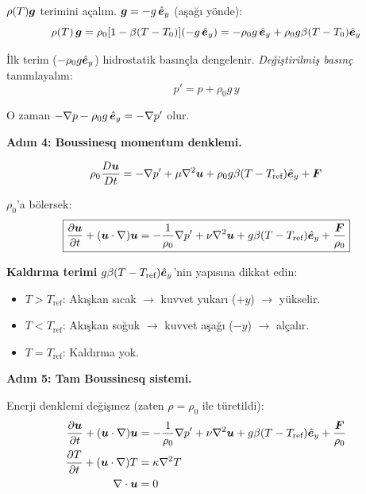$\rho(T)\bm{g}$ terimini açalım. $\bm{g} = -g\,\hat{\bm{e}}_y$ (aşağı yönde):
\begin{equation}
    \rho(T)\,\bm{g} = \rho_0[1 - \beta(T-T_0)](-g\,\hat{\bm{e}}_y) = -\rho_0 g\,\hat{\bm{e}}_y + \rho_0 g\beta(T-T_0)\hat{\bm{e}}_y
\end{equation}

İlk terim ($-\rho_0 g\hat{\bm{e}}_y$) hidrostatik basınçla dengelenir. \textit{Değiştirilmiş basınç} tanımlayalım:
\begin{equation}
    p' = p + \rho_0 g\,y
    \label{eq:modified_pressure}
\end{equation}

O zaman $-\nabla p - \rho_0 g\,\hat{\bm{e}}_y = -\nabla p'$ olur.

\textbf{Adım 4: Boussinesq momentum denklemi.}

\begin{equation}
    \rho_0\frac{D \bm{u}}{Dt} = -\nabla p' + \mu\nabla^2\bm{u} + \rho_0 g\beta(T - T_{\text{ref}})\hat{\bm{e}}_y + \bm{F}
\end{equation}

$\rho_0$'a bölersek:
\begin{equation}
    \boxed{\frac{\partial \bm{u}}{\partial t} + (\bm{u}\cdot\nabla)\bm{u} = -\frac{1}{\rho_0}\nabla p' + \nu\nabla^2\bm{u} + g\beta(T - T_{\text{ref}})\hat{\bm{e}}_y + \frac{\bm{F}}{\rho_0}}
    \label{eq:boussinesq_momentum}
\end{equation}

\textbf{Kaldırma terimi} $g\beta(T - T_{\text{ref}})\hat{\bm{e}}_y$'nin yapısına dikkat edin:
\begin{itemize}
    \item $T > T_{\text{ref}}$: Akışkan sıcak $\to$ kuvvet yukarı ($+y$) $\to$ yükselir.
    \item $T < T_{\text{ref}}$: Akışkan soğuk $\to$ kuvvet aşağı ($-y$) $\to$ alçalır.
    \item $T = T_{\text{ref}}$: Kaldırma yok.
\end{itemize}

\textbf{Adım 5: Tam Boussinesq sistemi.}

Enerji denklemi değişmez (zaten $\rho = \rho_0$ ile türetildi):
\begin{subequations}
\label{eq:boussinesq_system}
\begin{align}
    \frac{\partial \bm{u}}{\partial t} + (\bm{u}\cdot\nabla)\bm{u} &= -\frac{1}{\rho_0}\nabla p' + \nu\nabla^2\bm{u} + g\beta(T - T_{\text{ref}})\hat{\bm{e}}_y + \frac{\bm{F}}{\rho_0} \label{eq:bouss_mom} \\
    \frac{\partial T}{\partial t} + (\bm{u}\cdot\nabla)T &= \kappa\nabla^2 T \label{eq:bouss_ene} \\
    \nabla \cdot\bm{u} &= 0 \label{eq:bouss_cont}
\end{align}
\end{subequations}

